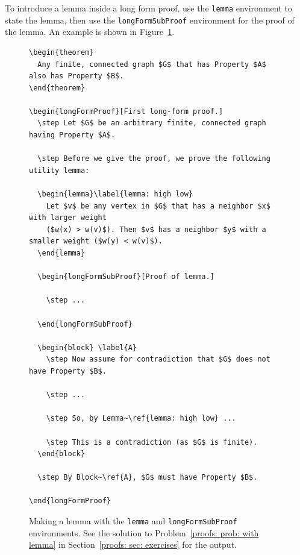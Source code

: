 To introduce a lemma inside a long form proof,
use the \texttt{lemma} environment to state the lemma,
then use the \texttt{longFormSubProof} environment for the proof of the lemma.
An example is shown in Figure~\ref{proofs: fig: lemma}.

\begin{figure}
\begin{framed}\small
\begin{verbatim}
\begin{theorem}
  Any finite, connected graph $G$ that has Property $A$ also has Property $B$.
\end{theorem}

\begin{longFormProof}[First long-form proof.]
  \step Let $G$ be an arbitrary finite, connected graph having Property $A$.

  \step Before we give the proof, we prove the following utility lemma:

  \begin{lemma}\label{lemma: high low}
    Let $v$ be any vertex in $G$ that has a neighbor $x$ with larger weight
    ($w(x) > w(v)$). Then $v$ has a neighbor $y$ with a smaller weight ($w(y) < w(v)$).
  \end{lemma}

  \begin{longFormSubProof}[Proof of lemma.]

    \step ...

  \end{longFormSubProof}

  \begin{block} \label{A}
    \step Now assume for contradiction that $G$ does not have Property $B$.
    
    \step ...

    \step So, by Lemma~\ref{lemma: high low} ...

    \step This is a contradiction (as $G$ is finite).  
  \end{block}

  \step By Block~\ref{A}, $G$ must have Property $B$.

\end{longFormProof}
\end{verbatim}
\vspace*{-10pt}
\end{framed}
\caption{Making a lemma with the \texttt{lemma} and \texttt{longFormSubProof} environments.
  See the solution to Problem~\ref{proofs: prob: with lemma} in Section~\ref{proofs: sec: exercises} for the output.
}\label{proofs: fig: lemma}
\end{figure}

